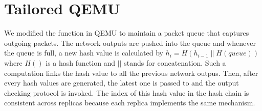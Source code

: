 \section{Tailored QEMU} \label{sec:qemu}

We modified the \taprecv function in QEMU to maintain a packet queue that 
captures outgoing packets. The network outputs are pushed into the queue 
and whenever the queue is full, a new hash value is calculated by $h_i=H(h_{i-1}\|H(queue))$
where $H()$ is a hash function and $||$ stands for concatenation. Such a computation 
links the hash value to all the previous network outpus. Then, after every \thashcomp  
hash values are generated, the latest one is passed to \smrsystem and the output 
checking protocol is invoked. The index of this hash value in the hash chain is 
consistent across replicas because each replica implements the same mechanism. 
